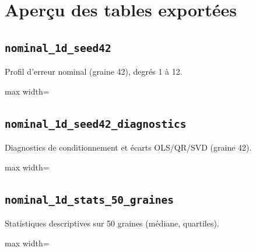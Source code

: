 \documentclass[a4paper,10pt]{article}
\newcommand{\tablesroot}{results/tables}
\begin{document}
\section*{Aper\c{c}u des tables export\'ees}

\noindent\begin{minipage}{\linewidth}
\subsection*{\texttt{nominal\_1d\_seed42}}
Profil d'erreur nominal (graine 42), degr\'es 1 \`a 12.
\par
\begingroup\centering\footnotesize
\begin{adjustbox}{max width=\linewidth}

\end{adjustbox}\par
\endgroup
\end{minipage}
\par\medskip

\noindent\begin{minipage}{\linewidth}
\subsection*{\texttt{nominal\_1d\_seed42\_diagnostics}}
Diagnostics de conditionnement et \'ecarts OLS/QR/SVD (graine 42).
\par
\begingroup\centering\footnotesize
\begin{adjustbox}{max width=\linewidth}

\end{adjustbox}\par
\endgroup
\end{minipage}
\par\medskip

\noindent\begin{minipage}{\linewidth}
\subsection*{\texttt{nominal\_1d\_stats\_50\_graines}}
Statistiques descriptives sur 50 graines (m\'ediane, quartiles).
\par
\begingroup\centering\footnotesize
\begin{adjustbox}{max width=\linewidth}

\end{adjustbox}\par
\endgroup
\end{minipage}
\par\medskip
\end{document}
